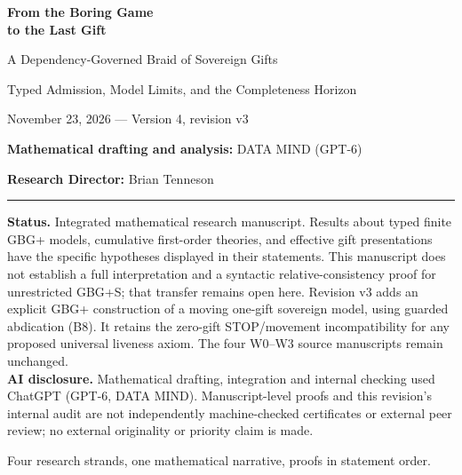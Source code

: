 \documentclass[11pt,letterpaper]{article}
\theoremstyle{definition}\newtheorem{definition}[theorem]{Definition}\newtheorem{example}[theorem]{Example}
\theoremstyle{remark}\newtheorem{remark}[theorem]{Remark}
\begin{document}
\hypersetup{pageanchor=false}
\begin{titlepage}
\centering
\vspace*{0.9in}
{\huge\bfseries From the Boring Game\\[0.2em] to the Last Gift\par}
\vspace{0.32in}
{\Large A Dependency-Governed Braid of Sovereign Gifts\par}
\vspace{0.13in}
{\large Typed Admission, Model Limits, and the Completeness Horizon\par}
\vspace{0.55in}
{\large November 23, 2026 --- Version 4, revision v3\par}
\vspace{0.35in}
{\large \textbf{Mathematical drafting and analysis:} DATA MIND (GPT-6)\par}
{\large \textbf{Research Director:} Brian Tenneson\par}
\vspace{0.62in}
\rule{0.82\textwidth}{0.65pt}
\begin{minipage}{0.83\textwidth}\small
\textbf{Status.} Integrated mathematical research manuscript. Results about typed finite GBG+ models, cumulative first-order theories, and effective gift presentations have the specific hypotheses displayed in their statements. This manuscript does not establish a full interpretation and a syntactic relative-consistency proof for unrestricted GBG+S; that transfer remains open here. Revision v3 adds an explicit GBG+ construction of a moving one-gift sovereign model, using guarded abdication (B8). It retains the zero-gift STOP/movement incompatibility for any proposed universal liveness axiom. The four W0--W3 source manuscripts remain unchanged.\\[0.5em]
\textbf{AI disclosure.} Mathematical drafting, integration and internal checking used ChatGPT (GPT-6, DATA MIND). Manuscript-level proofs and this revision's internal audit are not independently machine-checked certificates or external peer review; no external originality or priority claim is made.
\end{minipage}
\vfill
{\small Four research strands, one mathematical narrative, proofs in statement order.}
\end{titlepage}
\hypersetup{pageanchor=true}
\end{document}
